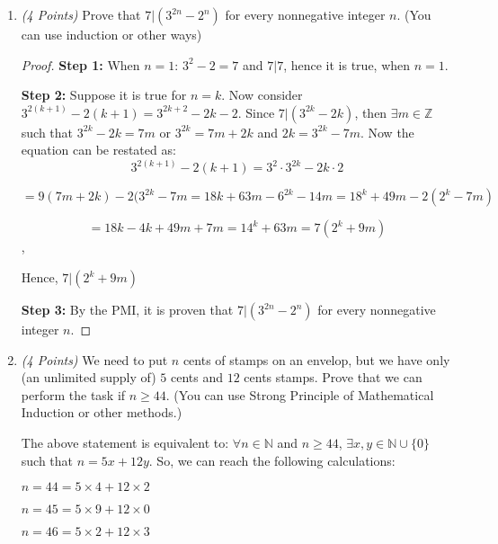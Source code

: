 \documentclass[10pt]{article} %
\newcommand{\N}{\mathbb{N}}
\newcommand{\Z}{\mathbb{Z}}
\newcommand{\points}[1]{{\it (#1 Points)}}
\begin{document}
\begin{enumerate}
\begin{proof}
{\bf Step 3:} By the PMI, we have proven that for every positive integer $n$,
    $$1+\frac{1}{4}+\frac{1}{9}+\cdots+\frac{1}{n^2}\le 2-\frac{1}{n}.$$

\end{proof}

\bigskip

\item \points{4} Prove that $7 |  (3^{2n}-2^n)$ for every nonnegative integer $n$. (You can use induction or other ways)

\bigskip

\begin{proof}


{\bf Step 1:} When $n=1$: $3^2 - 2 = 7$ and $7|7$, hence it is true, when $n=1$.  

{\bf Step 2:} Suppose it is true for $n=k$.  Now consider $3^{2(k+1)}-2(k+1) = 3^{2k+2} - 2k - 2$.  Since $7|(3^{2k}-2k)$, then $\exists m \in \Z$ such that $3^{2k}-2k = 7m$ or $3^{2k}=7m+2k$ and $2k=3^{2k}-7m$.  Now the equation can be restated as: $$3^{2(k+1)}-2(k+1) = 3^2 \cdot 3^{2k} - 2k \cdot 2$$

$$=9(7m+2k) - 2(3^{2k}-7m = 18k+63m-6^{2k}-14m = 18^k+49m-2(2^k-7m)$$

$$=18k-4k+49m+7m=14^k+63m=7(2^k+9m)$$, 

Hence, $7|(2^k+9m)$

{\bf Step 3:} By the PMI, it is proven that $7 |  (3^{2n}-2^n)$ for every nonnegative integer $n$.

\end{proof}

\bigskip
    
\item \points{4} We need to put $n$ cents of stamps on an envelop, but we have only (an unlimited
supply of) $5$ cents and $12$ cents stamps. Prove that we can perform the task if $n \ge 44$. (You can use Strong Principle of Mathematical Induction or
other methods.)

\bigskip

 The above statement is equivalent to: $\forall n \in \N$ and $n \geq 44$, $\exists x,y \in \N \cup \{0\}$ such that $n=5x+12y$.  So, we can reach the following calculations:

$n=44=5 \times 4 + 12 \times 2$

$n=45=5 \times 9 + 12 \times 0$

$n=46=5 \times 2 + 12 \times 3$


\end{enumerate}
\end{document}
